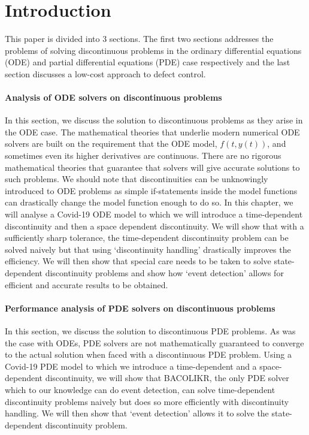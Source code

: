 \documentclass{article}
\begin{document}
\section{Introduction}
This paper is divided into 3 sections. The first two sections addresses the problems of solving discontinuous problems in the ordinary differential equations (ODE) and partial differential equations (PDE) case respectively and the last section discusses a low-cost approach to defect control. 

\paragraph{Analysis of ODE solvers on discontinuous problems}
In this section, we discuss the solution to discontinuous problems as they arise in the ODE case. The mathematical theories that underlie modern numerical ODE solvers are built on the requirement that the ODE model, $f(t, y(t))$, and sometimes even its higher derivatives are continuous. There are no rigorous mathematical theories that guarantee that solvers will give accurate solutions to such problems. We should note that discontinuities can be unknowingly introduced to ODE problems as simple if-statements inside the model functions can drastically change the model function enough to do so. In this chapter, we will analyse a Covid-19 ODE model to which we will introduce a time-dependent discontinuity and then a space dependent discontinuity. We will show that with a sufficiently sharp tolerance, the time-dependent discontinuity problem can be solved naively but that using `discontinuity handling' drastically improves the efficiency. We will then show that special care needs to be taken to solve state-dependent discontinuity problems and show how `event detection' allows for efficient and accurate results to be obtained. 

\paragraph{Performance analysis of PDE solvers on discontinuous problems}
In this section, we discuss the solution to discontinuous PDE problems. As was the case with ODEs, PDE solvers are not mathematically guaranteed to converge to the actual solution when faced with a discontinuous PDE problem. Using a Covid-19 PDE model to which we introduce a time-dependent and a space-dependent discontinuity, we will show that BACOLIKR, the only PDE solver which to our knowledge can do event detection, can solve time-dependent discontinuity problems naively but does so more efficiently with discontinuity handling. We will then show that `event detection' allows it to solve the state-dependent discontinuity problem.
\end{document}
